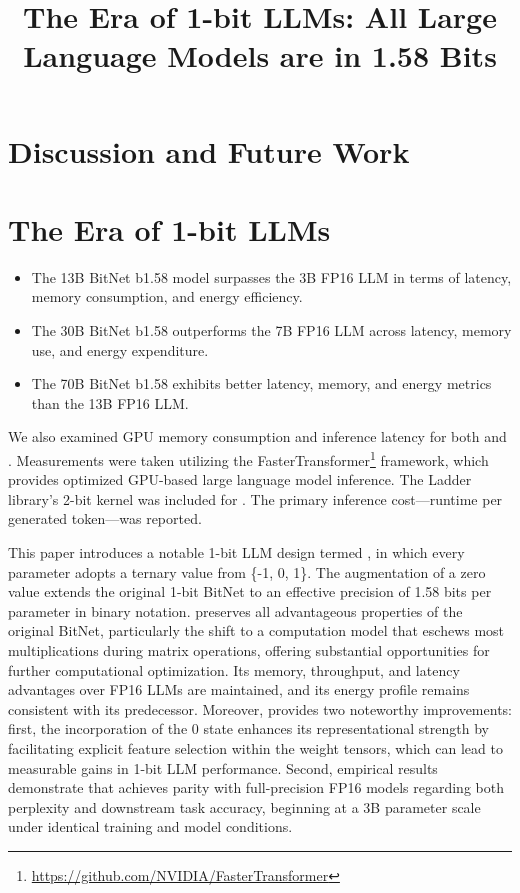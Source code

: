 \title{The Era of 1-bit LLMs: All Large Language Models are in 1.58 Bits}
\section{Discussion and Future Work}

\section{The Era of 1-bit LLMs}

\begin{itemize}
    \item The 13B BitNet b1.58 model surpasses the 3B FP16 LLM in terms of latency, memory consumption, and energy efficiency.
    \item The 30B BitNet b1.58 outperforms the 7B FP16 LLM across latency, memory use, and energy expenditure.
    \item The 70B BitNet b1.58 exhibits better latency, memory, and energy metrics than the 13B FP16 LLM.
\end{itemize}

We also examined GPU memory consumption and inference latency for both  and . Measurements were taken utilizing the FasterTransformer\footnote{\url{https://github.com/NVIDIA/FasterTransformer}} framework, which provides optimized GPU-based large language model inference. The Ladder~\cite{ladder} library’s 2-bit kernel was included for . The primary inference cost—runtime per generated token—was reported.

This paper introduces a notable 1-bit LLM design termed \textbf{}, in which every parameter adopts a ternary value from \{-1, 0, 1\}. The augmentation of a zero value extends the original 1-bit BitNet to an effective precision of 1.58 bits per parameter in binary notation.  preserves all advantageous properties of the original BitNet, particularly the shift to a computation model that eschews most multiplications during matrix operations, offering substantial opportunities for further computational optimization. Its memory, throughput, and latency advantages over FP16 LLMs are maintained, and its energy profile remains consistent with its predecessor. Moreover,  provides two noteworthy improvements: first, the incorporation of the 0 state enhances its representational strength by facilitating explicit feature selection within the weight tensors, which can lead to measurable gains in 1-bit LLM performance. Second, empirical results demonstrate that  achieves parity with full-precision FP16 models regarding both perplexity and downstream task accuracy, beginning at a 3B parameter scale under identical training and model conditions.

